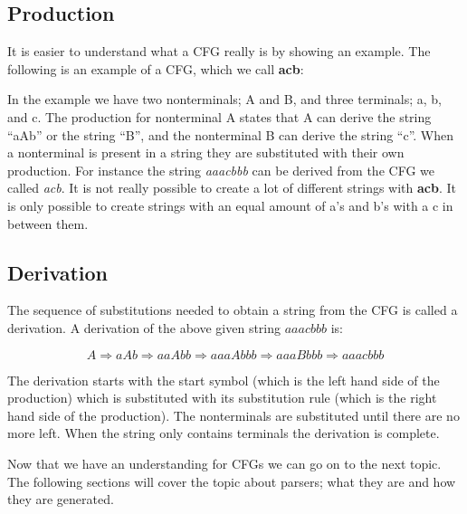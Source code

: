 \subsection{Production}
It is easier to understand what a CFG really is by showing an example. The following is an example of a CFG, which we call \textbf{acb}:

\begin{center}
	\begin{ebnf}
	\end{ebnf}
\end{center}

In the example we have two nonterminals; A and B, and three terminals; a, b, and c. The production for nonterminal A states that A can derive the string ``aAb'' or the string ``B'', and the nonterminal B can derive the string ``c''. When a nonterminal is present in a string they are substituted with their own production. For instance the string \textit{aaacbbb} can be derived from the CFG we called \textit{acb}. It is not really possible to create a lot of different strings with \textbf{acb}. It is only possible to create strings with an equal amount of a's and b's with a c in between them.

\subsection{Derivation}
The sequence of substitutions needed to obtain a string from the CFG is called a derivation.\cite[p. 100]{itttoc} A derivation of the above given string $aaacbbb$ is:

\[ 
A \Rightarrow aAb \Rightarrow aaAbb \Rightarrow aaaAbbb \Rightarrow aaaBbbb \Rightarrow aaacbbb 
\]

The derivation starts with the start symbol (which is the left hand side of the production) which is substituted with its substitution rule (which is the right hand side of the production). The nonterminals are substituted until there are no more left. When the string only contains terminals the derivation is complete.

Now that we have an understanding for CFGs we can go on to the next topic. The following sections will cover the topic about parsers; what they are and how they are generated.